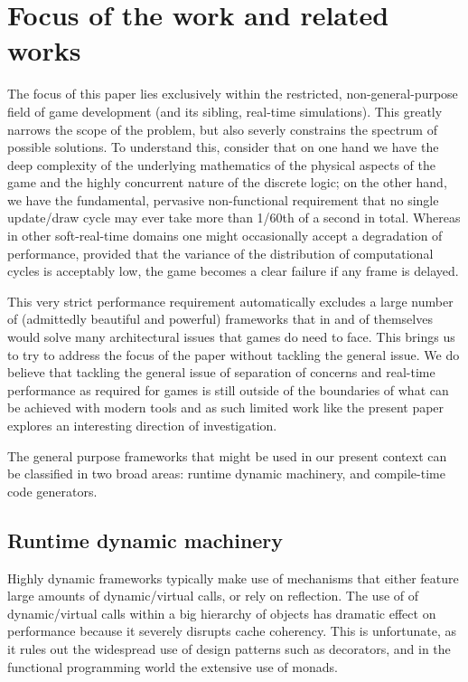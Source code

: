 \section{Focus of the work and related works}
\label{sec:focus}
The focus of this paper lies exclusively within the restricted, non-general-purpose field of game development (and its sibling, real-time simulations). This greatly narrows the scope of the problem, but also severly constrains the spectrum of possible solutions. To understand this, consider that on one hand we have the deep complexity of the underlying mathematics of the physical aspects of the game and the highly concurrent nature of the discrete logic; on the other hand, we have the fundamental, pervasive non-functional requirement that no single update/draw cycle may ever take more than 1/60th of a second in total. Whereas in other soft-real-time domains one might occasionally accept a degradation of performance, provided that the variance of the distribution of computational cycles is acceptably low, the game becomes a clear failure if any frame is delayed.

This very strict performance requirement automatically excludes a large number of (admittedly beautiful and powerful) frameworks that in and of themselves would solve many architectural issues that games do need to face. This brings us to try to address the focus of the paper without tackling the general issue. We do believe that tackling the general issue of separation of concerns and real-time performance as required for games is still outside of the boundaries of what can be achieved with modern tools and as such limited work like the present paper explores an interesting direction of investigation.

The general purpose frameworks that might be used in our present context can be classified in two broad areas: runtime dynamic machinery, and compile-time code generators.

\subsection{Runtime dynamic machinery}
Highly dynamic frameworks typically make use of mechanisms that either feature large amounts of dynamic/virtual calls, or rely on reflection. The use of of dynamic/virtual calls within a big hierarchy of objects has dramatic effect on performance \cite{ungar1992object} because it severely disrupts cache coherency. This is unfortunate, as it rules out the widespread use of design patterns such as decorators, and in the functional programming world the extensive use of monads.

